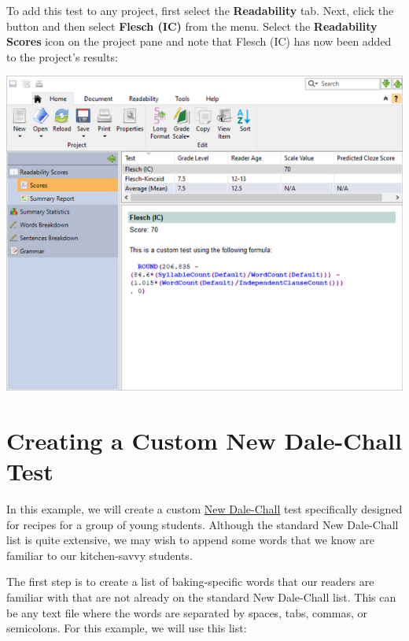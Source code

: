 \documentclass[
]{book}
\theoremstyle{definition}
\theoremstyle{definition}
\theoremstyle{definition}
\theoremstyle{definition}
\theoremstyle{remark}
\begin{document}
To add this test to any project, first select the \textbf{Readability} tab. Next, click the  button and then select \textbf{Flesch (IC)} from the menu. Select the \textbf{Readability Scores} icon on the project pane and note that Flesch (IC) has now been added to the project's results:

\includegraphics{Images/CustomTestExample1Score.png}


\hypertarget{creating-a-custom-new-dale-chall-test}{%
\section{\texorpdfstring{Creating a Custom New Dale-Chall Test}{Creating a Custom New Dale-Chall Test}}\label{creating-a-custom-new-dale-chall-test}}

In this example, we will create a custom \protect\hyperlink{dale-chall-test}{New Dale-Chall} test specifically designed for recipes for a group of young students. Although the standard New Dale-Chall list is quite extensive, we may wish to append some words that we know are familiar to our kitchen-savvy students.

The first step is to create a list of baking-specific words that our readers are familiar with that are not already on the standard New Dale-Chall list. This can be any text file where the words are separated by spaces, tabs, commas, or semicolons. For this example, we will use this list:
\end{document}
